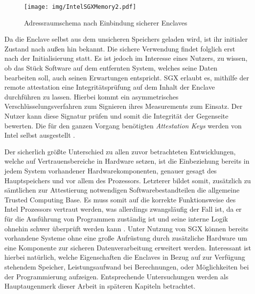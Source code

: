 \begin{figure}
	\texttt{[image: img/IntelSGXMemory2.pdf]}
	\centering
	\caption{Adressraumschema nach Einbindung sicherer Enclaves}
	\label{fig:intelsgxmemory2}
\end{figure}

Da die Enclave selbst aus dem unsicheren Speichers geladen wird, ist ihr initialer Zustand nach außen hin bekannt. Die sichere Verwendung findet folglich erst nach der Initialisierung statt. Es ist jedoch im Interesse eines Nutzers, zu wissen, ob das Stück Software auf dem entfernten System, welches seine Daten bearbeiten soll, auch seinen Erwartungen entspricht. \ac{SGX} erlaubt es, mithilfe der remote attestation eine Integritätsprüfung auf dem Inhalt der Enclave durchführen zu lassen. Hierbei kommt ein asymmetrisches Verschlüsselungsverfahren zum Signieren ihres Measurements zum Einsatz. Der Nutzer kann diese Signatur prüfen und somit die Integrität der Gegenseite bewerten. Die für den ganzen Vorgang benötigten \textit{Attestation Keys} werden von Intel selbst ausgestellt \cite{Johnson2016}.

Der sicherlich größte Unterschied zu allen zuvor betrachteten Entwicklungen, welche auf Vertrauensbereiche in Hardware setzen, ist die Einbeziehung bereits in jedem System vorhandener Hardwarekomponenten, genauer gesagt des Hauptspeichers und vor allem des Prozessors. Letzterer bildet somit, zusätzlich zu sämtlichen zur Attestierung notwendigen Softwarebestandteilen die allgemeine Trusted Computing Base. Es muss somit auf die korrekte Funktionsweise des Intel Prozessors vertraut werden, was allerdings zwangsläufig der Fall ist, da er für die Ausführung von Programmen zuständig ist und seine interne Logik ohnehin schwer überprüft werden kann \cite{Aumasson2016}. Unter Nutzung von \ac{SGX} können bereits vorhandene Systeme ohne eine große Aufrüstung durch zusätzliche Hardware um eine Komponente zur sicheren Datenverarbeitung erweitert werden. Interessant ist hierbei natürlich, welche Eigenschaften die Enclaves in Bezug auf zur Verfügung stehendem Speicher, Leistungsaufwand bei Berechnungen, oder Möglichkeiten bei der Programmierung aufzeigen. Entsprechende Untersuchungen werden als Hauptaugenmerk dieser Arbeit in späteren Kapiteln betrachtet.

